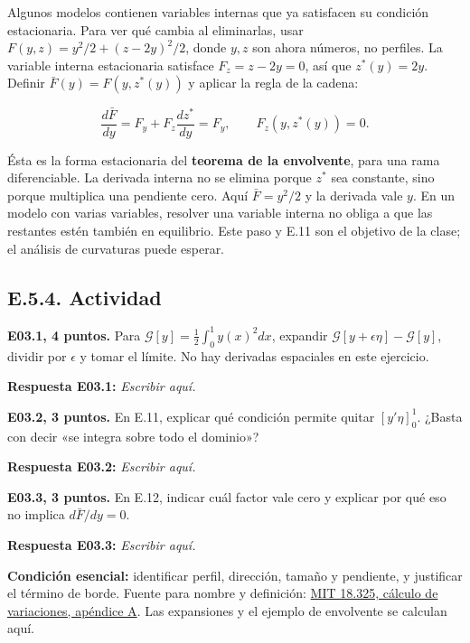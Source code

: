\documentclass[
  spanish,
  10pt,
  a4paper,
]{article}
\begin{document}
Algunos modelos contienen variables internas que ya satisfacen su
condición estacionaria. Para ver qué cambia al eliminarlas, usar
\(F(y,z)=y^2/2+(z-2y)^2/2\), donde \(y,z\) son ahora números, no
perfiles. La variable interna estacionaria satisface \(F_z=z-2y=0\), así
que \(z^*(y)=2y\). Definir \(\bar F(y)=F(y,z^*(y))\) y aplicar la regla
de la cadena:

\[
\frac{d\bar F}{dy}=F_y+F_z\frac{dz^*}{dy}=F_y,
\qquad F_z(y,z^*(y))=0.
\tag{E.12}
\]

Ésta es la forma estacionaria del \textbf{teorema de la envolvente},
para una rama diferenciable. La derivada interna no se elimina porque
\(z^*\) sea constante, sino porque multiplica una pendiente cero. Aquí
\(\bar F=y^2/2\) y la derivada vale \(y\). En un modelo con varias
variables, resolver una variable interna no obliga a que las restantes
estén también en equilibrio. Este paso y E.11 son el objetivo de la
clase; el análisis de curvaturas puede esperar.

\subsection{E.5.4. Actividad}\label{e.5.4.-actividad}


\textbf{E03.1, 4 puntos.} Para
\(\mathcal G[y]=\frac12\int_0^1 y(x)^2dx\), expandir
\(\mathcal G[y+\epsilon\eta]-\mathcal G[y]\), dividir por \(\epsilon\) y
tomar el límite. No hay derivadas espaciales en este ejercicio.

\textbf{Respuesta E03.1:} \emph{Escribir aquí.}


\textbf{E03.2, 3 puntos.} En E.11, explicar qué condición permite quitar
\([y'\eta]_0^1\). ¿Basta con decir «se integra sobre todo el dominio»?

\textbf{Respuesta E03.2:} \emph{Escribir aquí.}


\textbf{E03.3, 3 puntos.} En E.12, indicar cuál factor vale cero y
explicar por qué eso no implica \(d\bar F/dy=0\).

\textbf{Respuesta E03.3:} \emph{Escribir aquí.}

\textbf{Condición esencial:} identificar perfil, dirección, tamaño y
pendiente, y justificar el término de borde. Fuente para nombre y
definición:
\href{https://ocw.mit.edu/courses/18-325-topics-in-applied-mathematics-waves-and-imaging-fall-2015/834e98a77f64597a422c205b123cd6d7_MIT18_325F15_Appendix_A.pdf}{MIT
18.325, cálculo de variaciones, apéndice A}. Las expansiones y el
ejemplo de envolvente se calculan aquí.
\end{document}
